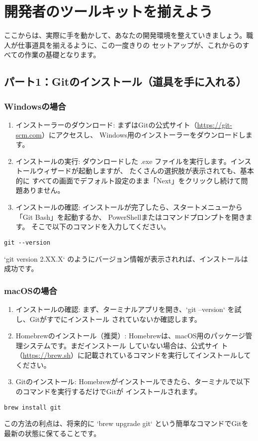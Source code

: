 \documentclass{ltjsarticle}
\begin{document}
\section{開発者のツールキットを揃えよう}
ここからは、実際に手を動かして、あなたの開発環境を整えていきましょう。職人が仕事道具を揃えるように、この一度きりの
セットアップが、これからのすべての作業の基礎となります。

\subsection{パート1：Gitのインストール（道具を手に入れる）}
\subsubsection{Windowsの場合}
\begin{enumerate}
    \item インストーラーのダウンロード: まずはGitの公式サイト（\url{https://git-scm.com}）にアクセスし、
		Windows用のインストーラーをダウンロードします。
    \item インストールの実行: ダウンロードした .exe ファイルを実行します。インストールウィザードが起動しますが、
		たくさんの選択肢が表示されても、基本的に
    すべての画面でデフォルト設定のまま「Next」をクリックし続けて問題ありません。
    \item インストールの確認: インストールが完了したら、スタートメニューから「Git Bash」を起動するか、
		PowerShellまたはコマンドプロンプトを開きます。
    そこで以下のコマンドを入力してください。
\end{enumerate}
\begin{verbatim}
git --version
\end{verbatim}
`git version 2.XX.X` のようにバージョン情報が表示されれば、インストールは成功です。

\subsubsection{macOSの場合}
\begin{enumerate}
    \item インストールの確認: まず、ターミナルアプリを開き、`git --version` を試し、Gitがすでにインストール
		されていないか確認します。
    \item Homebrewのインストール（推奨）: Homebrewは、macOS用のパッケージ管理システムです。まだインストール
		していない場合は、公式サイ
    ト（\url{https://brew.sh}）に記載されているコマンドを実行してインストールしてください。
    \item Gitのインストール: Homebrewがインストールできたら、ターミナルで以下のコマンドを実行するだけでGitが
		インストールされます。
\end{enumerate}
\begin{verbatim}
brew install git
\end{verbatim}
この方法の利点は、将来的に `brew upgrade git` という簡単なコマンドでGitを最新の状態に保てることです。
\end{document}
